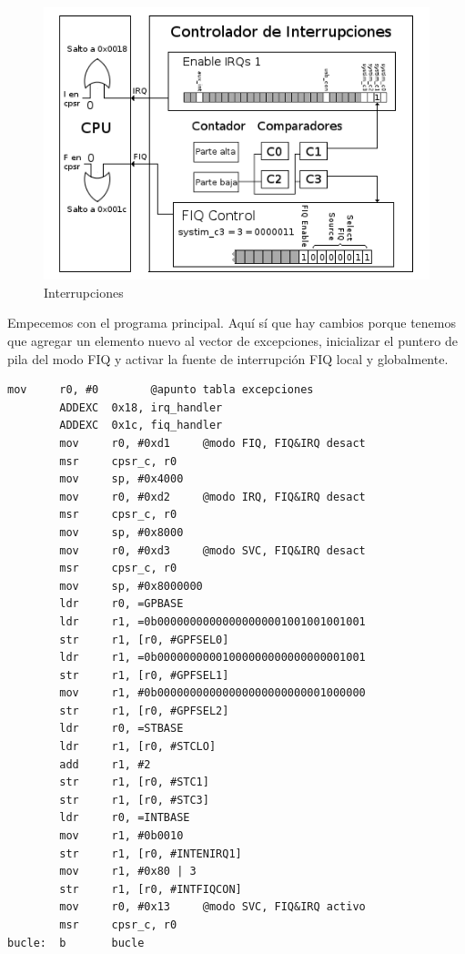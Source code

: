 \begin{figure}[h]
  \centering
    \includegraphics[width=14cm]{graphs/inter4.png}
  \caption{Interrupciones}
  \label{fig:inter4}
\end{figure}

Empecemos con el programa principal. Aquí sí que hay cambios porque tenemos que agregar un
elemento nuevo al vector de excepciones, inicializar el puntero de pila del modo FIQ y activar
la fuente de interrupción FIQ local y globalmente.

\begin{lstlisting}[caption={Programa principal de inter4.c},label={lst:codigoPract5_4}]
        mov     r0, #0        @apunto tabla excepciones
        ADDEXC  0x18, irq_handler
        ADDEXC  0x1c, fiq_handler
        mov     r0, #0xd1     @modo FIQ, FIQ&IRQ desact
        msr     cpsr_c, r0
        mov     sp, #0x4000
        mov     r0, #0xd2     @modo IRQ, FIQ&IRQ desact
        msr     cpsr_c, r0
        mov     sp, #0x8000
        mov     r0, #0xd3     @modo SVC, FIQ&IRQ desact
        msr     cpsr_c, r0
        mov     sp, #0x8000000
        ldr     r0, =GPBASE
        ldr     r1, =0b00000000000000000001001001001001
        str     r1, [r0, #GPFSEL0]
        ldr     r1, =0b00000000001000000000000000001001
        str     r1, [r0, #GPFSEL1]
        mov     r1, #0b00000000000000000000000001000000
        str     r1, [r0, #GPFSEL2]
        ldr     r0, =STBASE
        ldr     r1, [r0, #STCLO]
        add     r1, #2
        str     r1, [r0, #STC1]
        str     r1, [r0, #STC3]
        ldr     r0, =INTBASE
        mov     r1, #0b0010
        str     r1, [r0, #INTENIRQ1]
        mov     r1, #0x80 | 3
        str     r1, [r0, #INTFIQCON]
        mov     r0, #0x13     @modo SVC, FIQ&IRQ activo
        msr     cpsr_c, r0
bucle:  b       bucle
\end{lstlisting}

